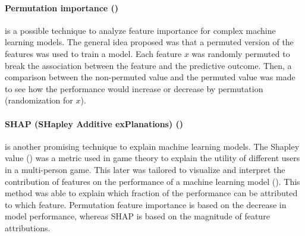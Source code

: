 \paragraph{Permutation importance (\cite{Altmann2010-lq})} is a possible technique to analyze feature importance for complex machine learning models. The general idea proposed was that a permuted version of the features was used to train a model. Each feature $x$ was randomly permuted to break the association between the feature and the predictive outcome. Then, a comparison between the non-permuted value and the permuted value was made to see how the performance would increase or decrease by permutation (randomization for $x$). 

\paragraph{SHAP (SHapley Additive exPlanations) (\cite{Lundberg2017-wo})} is another promising technique to explain machine learning models. The Shapley value (\cite{Shapley1953-cc}) was a metric used in game theory to explain the utility of different users in a multi-person game. This later was tailored to visualize and interpret the contribution of features on the performance of a machine learning model (\cite{Lundberg2017-wo}). This method was able to explain which fraction of the performance can be attributed to which feature. 
Permutation feature importance is based on the decrease in model performance, whereas SHAP is based on the magnitude of feature attributions.